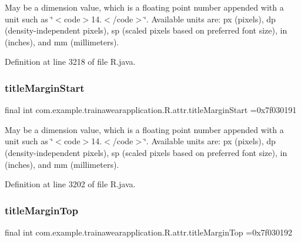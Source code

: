 May be a dimension value, which is a floating point number appended with a unit such as \char`\"{}$<$code$>$14.\+5sp$<$/code$>$\char`\"{}. Available units are\+: px (pixels), dp (density-\/independent pixels), sp (scaled pixels based on preferred font size), in (inches), and mm (millimeters). 

Definition at line 3218 of file R.\+java.

\mbox{\label{classcom_1_1example_1_1trainawearapplication_1_1_r_1_1attr_a9a63514ed04003c5630659a438d07c2d}} 
\subsubsection{\texorpdfstring{titleMarginStart}{titleMarginStart}}
{\footnotesize\ttfamily final int com.\+example.\+trainawearapplication.\+R.\+attr.\+title\+Margin\+Start =0x7f030191\hspace{0.3cm}{\ttfamily [static]}}

May be a dimension value, which is a floating point number appended with a unit such as \char`\"{}$<$code$>$14.\+5sp$<$/code$>$\char`\"{}. Available units are\+: px (pixels), dp (density-\/independent pixels), sp (scaled pixels based on preferred font size), in (inches), and mm (millimeters). 

Definition at line 3202 of file R.\+java.

\mbox{\label{classcom_1_1example_1_1trainawearapplication_1_1_r_1_1attr_af968df1a7cf49d006da04fb044fd9529}} 
\subsubsection{\texorpdfstring{titleMarginTop}{titleMarginTop}}
{\footnotesize\ttfamily final int com.\+example.\+trainawearapplication.\+R.\+attr.\+title\+Margin\+Top =0x7f030192\hspace{0.3cm}{\ttfamily [static]}}

